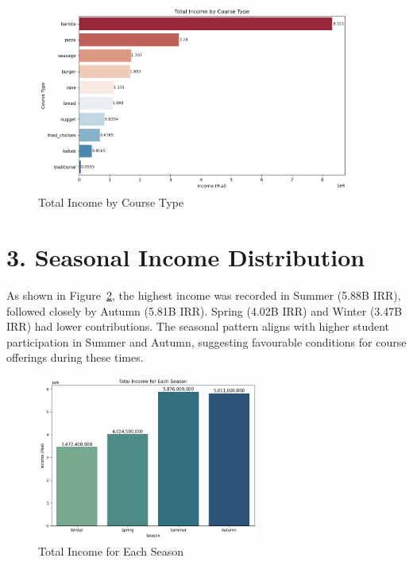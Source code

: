 \documentclass[12pt,a4paper]{article}
\begin{document}
\begin{figure}[h!]
    \centering
    \includegraphics[width=0.92\textwidth]{Total Income by Course Type.png}
    \caption{Total Income by Course Type}
    \label{fig:income-by-course-type}
\end{figure}

\section*{3. Seasonal Income Distribution}

As shown in Figure~\ref{fig:income-by-season}, the highest income was recorded in Summer (5.88B IRR), followed closely by Autumn (5.81B IRR). Spring (4.02B IRR) and Winter (3.47B IRR) had lower contributions. The seasonal pattern aligns with higher student participation in Summer and Autumn, suggesting favourable conditions for course offerings during these times.

\begin{figure}[h!]
    \centering
    \includegraphics[width=0.65\textwidth]{Total Income for Each Season.png}
    \caption{Total Income for Each Season}
    \label{fig:income-by-season}
\end{figure}
\end{document}
